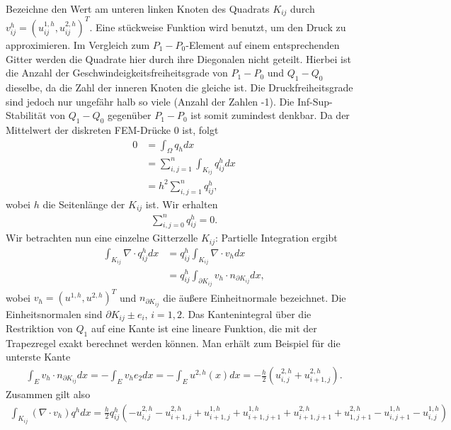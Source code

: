 \begin{beispiel}
Bezeichne den Wert am unteren linken Knoten des Quadrats $K_{ij}$ durch $v_{ij}^{h}= (u_{ij}^{1, h}, u_{ij}^{2, h})^{T}$. Eine stückweise Funktion wird benutzt, um den Druck zu approximieren. Im Vergleich zum $P_{1}- P_{0}$-Element auf einem entsprechenden Gitter werden die Quadrate hier durch ihre Diegonalen nicht geteilt. Hierbei ist die Anzahl der Geschwindeigkeitsfreiheitsgrade von $P_{1}-P_{0}$ und $Q_{1}-Q_{0}$ dieselbe, da die Zahl der inneren Knoten die gleiche ist. Die Druckfreiheitsgrade sind jedoch nur ungefähr halb so viele (Anzahl der Zahlen -1). Die Inf-Sup-Stabilität von $Q_{1}-Q_{0}$ gegenüber $P_{1} - P_{0}$ ist somit zumindest denkbar. Da der Mittelwert der diskreten FEM-Drücke $0$ ist, folgt
\begin{align*}
  0 &= \int_{\Omega} q_{h} dx\\
  & = \sum_{i, j = 1}^{n} \int_{K_{ij}} q_{ij}^{h} dx\\
  &= h^{2} \sum_{i, j = 1}^{n} q_{ij}^{h},
\end{align*}
wobei $h$ die Seitenlänge der $K_{ij}$ ist. Wir erhalten
\begin{align*}
  \sum_{i, j = 0}^{n} q_{ij}^{h} = 0.
\end{align*}
Wir betrachten nun eine einzelne Gitterzelle $K_{ij}$: Partielle Integration ergibt
\begin{align*}
  \int_{K_{ij}} \nabla\cdot q_{ij}^{h} dx  &= q_{ij}^{h} \int_{K_{ij}} \nabla\cdot v_{h} dx\\
  &= q_{ij}^{h} \int_{\partial K_{ij}} v_{h}\cdot n_{\partial K_{ij}} dx,
\end{align*}
wobei $v_{h} = (u^{1, h}, u^{2, h})^{T}$ und $n_{\partial K_{ij}}$ die äußere Einheitnormale bezeichnet. Die Einheitsnormalen sind $\partial K_{ij} \pm e_{i}$, $i = 1, 2$. Das Kantenintegral über die Restriktion von $Q_{1}$ auf eine Kante ist eine lineare Funktion, die mit der Trapezregel exakt berechnet werden können. Man erhält zum Beispiel für die unterste Kante
\begin{align*}
  \int_{E} v_{h}\cdot n_{\partial K_{ij}} dx = -\int_{E} v_{h} e_{2} dx =  - \int_{E} u^{2, h}(x) dx = -\frac h 2 (u_{i, j}^{2, h} + u_{i+1, j}^{2, h}). 
\end{align*}
Zusammen gilt also
\begin{align*}
  \int_{K_{ij}} (\nabla\cdot v_{h})q^{h} dx = \frac h 2 q_{ij}^{h}(- u_{i,j}^{2, h} - u_{i+1, j}^{2, h} + u_{i+1, j}^{1, h}+ u_{i+1, j+1}^{1, h} + u_{i+1, j+1}^{2, h} + u_{1, j+1}^{2, h} - u_{i, j+1}^{1, h} - u_{i, j}^{1, h})
\end{align*}

\end{beispiel}
